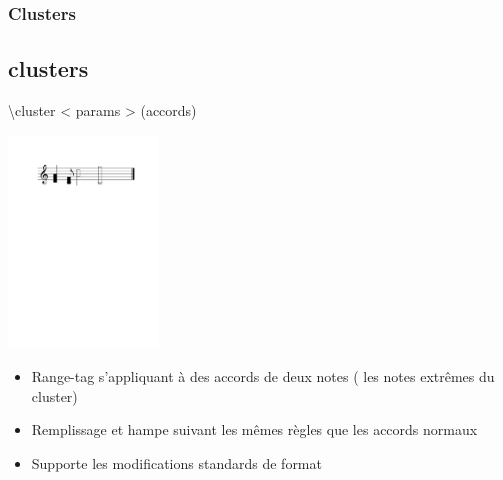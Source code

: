 \documentclass[12pt]{beamer}
\newenvironment{code}
  {\fontfamily{prc}\selectfont}{}
\begin{document}
    \begin{frame}
    \frametitle{Clusters}
    \subsection{clusters}
    
    \begin{code} \textbackslash{}cluster \textless{} params \textgreater{} (accords) \end{code}
    
    \vspace{5mm}
    \centering  \includegraphics[width=4cm]{img/partitions/cluster.pdf}
    
    \begin{itemize}
      \item Range-tag s’appliquant \`a des accords de deux notes ( les notes extr\^emes du cluster)  
      \item Remplissage et hampe suivant les mêmes règles que les accords normaux
      \item Supporte les modifications standards de format
    \end{itemize}
    
    \end{frame}
\end{document}
